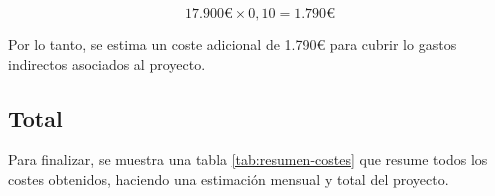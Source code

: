 \begin{equation}
17.900€ \times 0,10 = 1.790€
\end{equation}

Por lo tanto, se estima un coste adicional de 1.790€ para cubrir lo gastos indirectos asociados al proyecto.

\subsection{Total}

Para finalizar, se muestra una tabla \ref{tab:resumen-costes} que resume todos los costes obtenidos, haciendo una estimación mensual y total del proyecto.
\begin{table}[H]
    \centering
    \caption{Total de costes del proyecto}
    \label{tab:resumen-costes}
\end{table}
